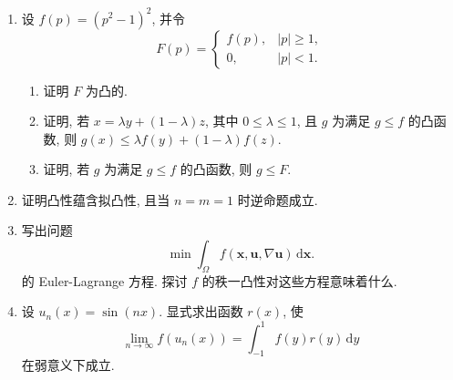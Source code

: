 \begin{enumerate}[label=\thesection.\arabic*.,ref=\thesection.\arabic*,start=9,series=book-problems]
\item\label{ex:quartic-double-well-lower-convex-envelope} 设 $f(p)=(p^2-1)^2$, 并令
\begin{equation}\label{eq:quartic-double-well-convex-minorant}
F(p)=\begin{cases}f(p),&|p|\geq1,\\0,&|p|<1.\end{cases}
\end{equation}
\begin{enumerate}[label=\alph*.]\item 证明 $F$ 为凸的.\item 证明, 若 $x=\lambda y+(1-\lambda)z$, 其中 $0\leq\lambda\leq1$, 且 $g$ 为满足 $g\leq f$ 的凸函数, 则 $g(x)\leq\lambda f(y)+(1-\lambda)f(z)$.\item 证明, 若 $g$ 为满足 $g\leq f$ 的凸函数, 则 $g\leq F$.\end{enumerate}

\item\label{ex:convexity-implies-quasiconvexity-one-dimensional-converse} 证明凸性蕴含拟凸性, 且当 $n=m=1$ 时逆命题成立.

\item\label{ex:rank-one-convexity-euler-lagrange-implications} 写出问题
\begin{equation}\label{eq:rank-one-convexity-euler-lagrange-exercise}
\min\int_\Omega f(\bm{x},\bm{u},\nabla\bm{u})\,\mathrm{d}\bm{x}.
\end{equation}
的 Euler-Lagrange 方程. 探讨 $f$ 的秩一凸性对这些方程意味着什么.

\item\label{ex:sine-oscillation-young-measure-density} 设 $u_n(x)=\sin(nx)$. 显式求出函数 $r(x)$, 使
\begin{equation}\label{eq:sine-oscillation-young-measure-density-exercise}
\lim_{n\to\infty}f(u_n(x))=\int_{-1}^1f(y)r(y)\,\mathrm{d}y
\end{equation}
在弱意义下成立.

\end{enumerate}
